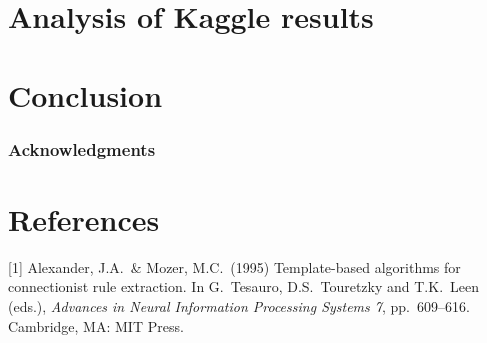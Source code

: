 \documentclass{article}
\begin{document}
\section{Analysis of Kaggle results}
\label{Kaggle-ana}

\section{Conclusion}
\label{con}

\subsubsection*{Acknowledgments}
\section*{References}
\small
[1] Alexander, J.A.\ \& Mozer, M.C.\ (1995) Template-based algorithms
for connectionist rule extraction. In G.\ Tesauro, D.S.\ Touretzky and
T.K.\ Leen (eds.), {\it Advances in Neural Information Processing
  Systems 7}, pp.\ 609--616. Cambridge, MA: MIT Press.
\end{document}
